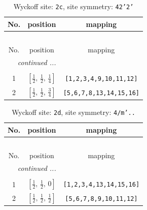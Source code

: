 \documentclass[fleqn,8pt]{jsarticle}
\begin{document}
\renewcommand{\arraystretch}{1.2}
\begin{longtable}{ccc}
\caption{Wyckoff site: {\tt 2c}, site symmetry: {\tt 42'2'}}
 \\
 \hline \hline
No. & position & mapping \\ \hline \endfirsthead

\multicolumn{2}{l}{\tablename\ \thetable{}} \\
 \hline \hline
No. & position & mapping \\ \hline \endhead

 \hline \hline
\multicolumn{2}{r}{\footnotesize\it continued ...} \\ \endfoot

 \hline \hline
\multicolumn{2}{r}{} \\ \endlastfoot

1 & $\left[ \frac{1}{2},\, \frac{1}{2},\, \frac{1}{4} \right]$ & {\tt [1,2,3,4,9,10,11,12]} \\ \hline
2 & $\left[ \frac{1}{2},\, \frac{1}{2},\, \frac{3}{4} \right]$ & {\tt [5,6,7,8,13,14,15,16]} \\
\end{longtable}
\renewcommand{\arraystretch}{1.2}
\begin{longtable}{ccc}
\caption{Wyckoff site: {\tt 2d}, site symmetry: {\tt 4/m'..}}
 \\
 \hline \hline
No. & position & mapping \\ \hline \endfirsthead

\multicolumn{2}{l}{\tablename\ \thetable{}} \\
 \hline \hline
No. & position & mapping \\ \hline \endhead

 \hline \hline
\multicolumn{2}{r}{\footnotesize\it continued ...} \\ \endfoot

 \hline \hline
\multicolumn{2}{r}{} \\ \endlastfoot

1 & $\left[ \frac{1}{2},\, \frac{1}{2},\, 0 \right]$ & {\tt [1,2,3,4,13,14,15,16]} \\ \hline
2 & $\left[ \frac{1}{2},\, \frac{1}{2},\, \frac{1}{2} \right]$ & {\tt [5,6,7,8,9,10,11,12]} \\
\end{longtable}
\renewcommand{\arraystretch}{1.2}
\end{document}
